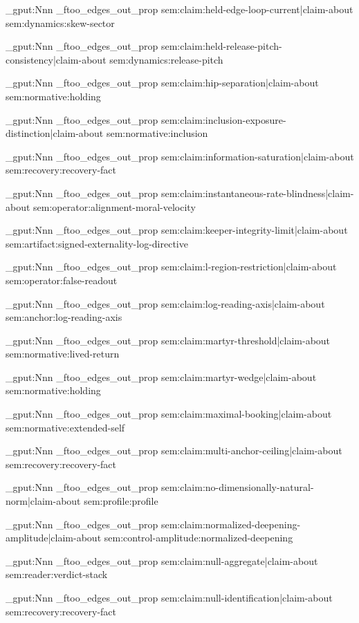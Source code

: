 \prop_gput:Nnn \g_ftoo_edges_out_prop { sem:claim:held-edge-loop-current|claim-about } { sem:dynamics:skew-sector }

\prop_gput:Nnn \g_ftoo_edges_out_prop { sem:claim:held-release-pitch-consistency|claim-about } { sem:dynamics:release-pitch }

\prop_gput:Nnn \g_ftoo_edges_out_prop { sem:claim:hip-separation|claim-about } { sem:normative:holding }

\prop_gput:Nnn \g_ftoo_edges_out_prop { sem:claim:inclusion-exposure-distinction|claim-about } { sem:normative:inclusion }

\prop_gput:Nnn \g_ftoo_edges_out_prop { sem:claim:information-saturation|claim-about } { sem:recovery:recovery-fact }

\prop_gput:Nnn \g_ftoo_edges_out_prop { sem:claim:instantaneous-rate-blindness|claim-about } { sem:operator:alignment-moral-velocity }

\prop_gput:Nnn \g_ftoo_edges_out_prop { sem:claim:keeper-integrity-limit|claim-about } { sem:artifact:signed-externality-log-directive }

\prop_gput:Nnn \g_ftoo_edges_out_prop { sem:claim:l-region-restriction|claim-about } { sem:operator:false-readout }

\prop_gput:Nnn \g_ftoo_edges_out_prop { sem:claim:log-reading-axis|claim-about } { sem:anchor:log-reading-axis }

\prop_gput:Nnn \g_ftoo_edges_out_prop { sem:claim:martyr-threshold|claim-about } { sem:normative:lived-return }

\prop_gput:Nnn \g_ftoo_edges_out_prop { sem:claim:martyr-wedge|claim-about } { sem:normative:holding }

\prop_gput:Nnn \g_ftoo_edges_out_prop { sem:claim:maximal-booking|claim-about } { sem:normative:extended-self }

\prop_gput:Nnn \g_ftoo_edges_out_prop { sem:claim:multi-anchor-ceiling|claim-about } { sem:recovery:recovery-fact }

\prop_gput:Nnn \g_ftoo_edges_out_prop { sem:claim:no-dimensionally-natural-norm|claim-about } { sem:profile:profile }

\prop_gput:Nnn \g_ftoo_edges_out_prop { sem:claim:normalized-deepening-amplitude|claim-about } { sem:control-amplitude:normalized-deepening }

\prop_gput:Nnn \g_ftoo_edges_out_prop { sem:claim:null-aggregate|claim-about } { sem:reader:verdict-stack }

\prop_gput:Nnn \g_ftoo_edges_out_prop { sem:claim:null-identification|claim-about } { sem:recovery:recovery-fact }

